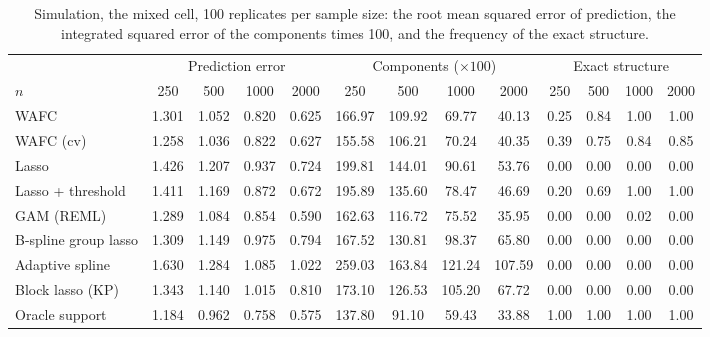 \begin{table}[tp]
\caption{Simulation, the mixed cell, 100 replicates per sample size: the root mean squared error of prediction, the integrated squared error of the components times 100, and the frequency of the exact structure.}
\label{tab:sim-sizes-mixed}
\centering
\footnotesize
\setlength{\tabcolsep}{3pt}
\begin{tabular}{l cccc cccc cccc}
\hline
 & \multicolumn{4}{c}{Prediction error} & \multicolumn{4}{c}{Components ($\times 100$)} & \multicolumn{4}{c}{Exact structure} \\
$n$ & 250 & 500 & 1000 & 2000 & 250 & 500 & 1000 & 2000 & 250 & 500 & 1000 & 2000 \\
\hline
WAFC & 1.301 & 1.052 & 0.820 & 0.625 & 166.97 & 109.92 & 69.77 & 40.13 & 0.25 & 0.84 & 1.00 & 1.00 \\
WAFC (cv) & 1.258 & 1.036 & 0.822 & 0.627 & 155.58 & 106.21 & 70.24 & 40.35 & 0.39 & 0.75 & 0.84 & 0.85 \\
Lasso & 1.426 & 1.207 & 0.937 & 0.724 & 199.81 & 144.01 & 90.61 & 53.76 & 0.00 & 0.00 & 0.00 & 0.00 \\
Lasso + threshold & 1.411 & 1.169 & 0.872 & 0.672 & 195.89 & 135.60 & 78.47 & 46.69 & 0.20 & 0.69 & 1.00 & 1.00 \\
GAM (REML) & 1.289 & 1.084 & 0.854 & 0.590 & 162.63 & 116.72 & 75.52 & 35.95 & 0.00 & 0.00 & 0.02 & 0.00 \\
B-spline group lasso & 1.309 & 1.149 & 0.975 & 0.794 & 167.52 & 130.81 & 98.37 & 65.80 & 0.00 & 0.00 & 0.00 & 0.00 \\
Adaptive spline & 1.630 & 1.284 & 1.085 & 1.022 & 259.03 & 163.84 & 121.24 & 107.59 & 0.00 & 0.00 & 0.00 & 0.00 \\
Block lasso (KP) & 1.343 & 1.140 & 1.015 & 0.810 & 173.10 & 126.53 & 105.20 & 67.72 & 0.00 & 0.00 & 0.00 & 0.00 \\
Oracle support & 1.184 & 0.962 & 0.758 & 0.575 & 137.80 & 91.10 & 59.43 & 33.88 & 1.00 & 1.00 & 1.00 & 1.00 \\
\hline
\end{tabular}
\end{table}

